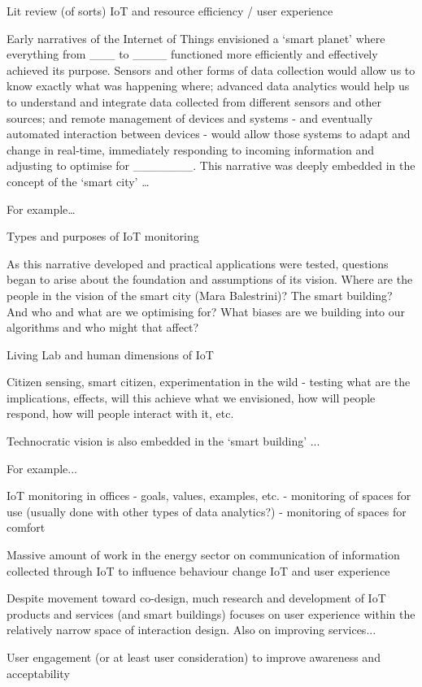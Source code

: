Lit review (of sorts)
IoT and resource efficiency / user experience

Early narratives of the Internet of Things envisioned a ‘smart planet’ where everything from ___ to ____ functioned more efficiently and effectively achieved its purpose. Sensors and other forms of data collection would allow us to know exactly what was happening where; advanced data analytics would help us to understand and integrate data collected from different sensors and other sources; and remote management of devices and systems - and eventually automated interaction between devices - would allow those systems to adapt and change in real-time, immediately responding to incoming information and adjusting to optimise for _______.
This narrative was deeply embedded in the concept of the ‘smart city’
…

For example…

Types and purposes of IoT monitoring

As this narrative developed and practical applications were tested,
questions began to arise about the foundation and assumptions of its
vision. Where are the people in the vision of the smart city (Mara
Balestrini)? The smart building? And who and what are we optimising
for? What biases are we building into our algorithms and who might
that affect?

Living Lab and human dimensions of IoT

Citizen sensing, smart citizen, experimentation in the wild - testing
what are the implications, effects, will this achieve what we
envisioned, how will people respond, how will people interact with it,
etc.

Technocratic vision is also embedded in the ‘smart building’ ...

For example...

IoT monitoring in offices - goals, values, examples, etc. - monitoring
of spaces for use (usually done with other types of data analytics?) -
monitoring of spaces for comfort

Massive amount of work in the energy sector on communication of information collected through IoT to influence behaviour change
IoT and user experience

Despite movement toward co-design, much research and development of IoT products and services (and smart buildings) focuses on user experience within the relatively narrow space of interaction design.
Also on improving services...

User engagement (or at least user consideration) to improve awareness
and acceptability

